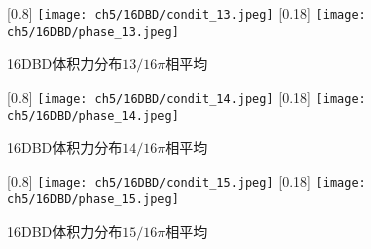 \begin{figure}
  \centering
  [0.8\textwidth]
    {\texttt{[image: ch5/16DBD/condit\_13.jpeg]}}
  [0.18\textwidth]
    {\texttt{[image: ch5/16DBD/phase\_13.jpeg]}}
  \caption{16DBD体积力分布$13/16\pi$相平均}
\end{figure}
\begin{figure}
  \centering
  [0.8\textwidth]
    {\texttt{[image: ch5/16DBD/condit\_14.jpeg]}}
  [0.18\textwidth]
    {\texttt{[image: ch5/16DBD/phase\_14.jpeg]}}
  \caption{16DBD体积力分布$14/16\pi$相平均}
\end{figure}
\begin{figure}
  \centering
  [0.8\textwidth]
    {\texttt{[image: ch5/16DBD/condit\_15.jpeg]}}
  [0.18\textwidth]
    {\texttt{[image: ch5/16DBD/phase\_15.jpeg]}}
  \caption{16DBD体积力分布$15/16\pi$相平均}
\end{figure} 